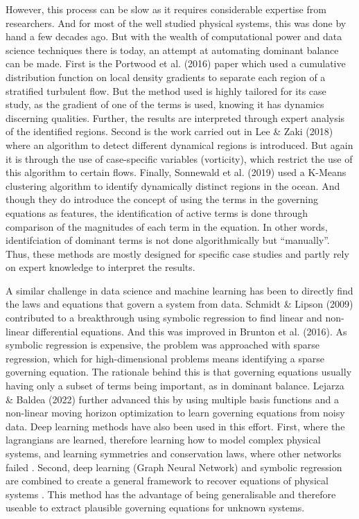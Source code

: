 \documentclass[12pt]{report} %
\begin{document}
\vspace{5mm}

However, this process can be slow as it requires considerable expertise from researchers. And for most of the well studied physical systems, this was done by hand a few decades ago. But with the wealth of computational power and data science techniques there is today, an attempt at automating dominant balance can be made. First is the Portwood et al. (2016)\cite{portwood2016robust} paper which used a cumulative distribution function on local density gradients to separate each region of a stratified turbulent flow. But the method used is highly tailored for its case study, as the gradient of one of the terms is used, knowing it has dynamics discerning qualities. Further, the results are interpreted through expert analysis of the identified regions. Second is the work carried out in Lee \& Zaki (2018)\cite{lee2018detection} where an algorithm to detect different dynamical regions is introduced. But again it is through the use of case-specific variables (vorticity), which restrict the use of this algorithm to certain flows. Finally, Sonnewald et al. (2019)\cite{sonnewald2019unsupervised} used a K-Means clustering algorithm to identify dynamically distinct regions in the ocean. And though they do introduce the concept of using the terms in the governing equations as features, the identification of active terms is done through comparison of the magnitudes of each term in the equation. In other words, identifciation of dominant terms is not done algorithmically but ``manually''. Thus, these methods are mostly designed for specific case studies and partly rely on expert knowledge to interpret the results.

\vspace{5mm}

A similar challenge in data science and machine learning has been to directly find the laws and equations that govern a system from data. Schmidt \& Lipson (2009)\cite{schmidt2009distilling} contributed to a breakthrough using symbolic regression to find linear and non-linear differential equations. And this was improved in Brunton et al. (2016)\cite{brunton2016discovering}. As symbolic regression is expensive, the problem was approached with sparse regression, which for high-dimensional problems means identifying a sparse governing equation. The rationale behind this is that governing equations usually having only a subset of terms being important, as in dominant balance. Lejarza \& Baldea (2022) further advanced this by using multiple basis functions and a non-linear moving horizon optimization to learn governing equations from noisy data. Deep learning methods have also been used in this effort. First, where the lagrangians are learned, therefore learning how to model complex physical systems, and learning symmetries and conservation laws, where other networks failed \cite{cranmer2020discovering}. Second, deep learning (Graph Neural Network) and symbolic regression are combined to create a general framework to recover equations of physical systems \cite{cranmer2020lagrangian}. This method has the advantage of being generalisable and therefore useable to extract plausible governing equations for unknown systems.
\end{document}
